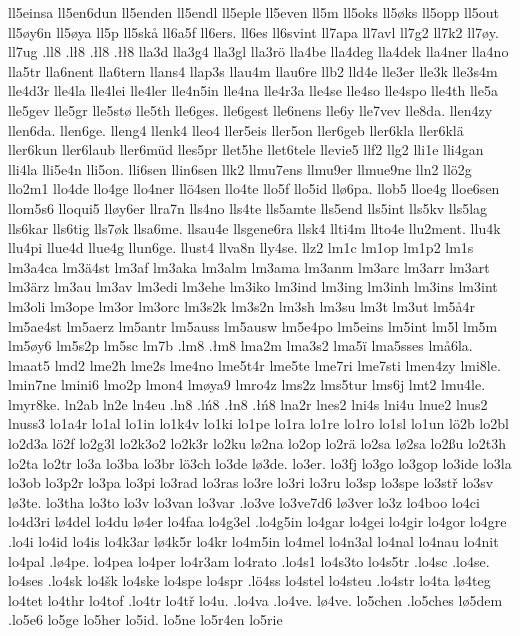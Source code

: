 {{ll5einsa
ll5en6dun
ll5enden
ll5endl
ll5eple
ll5even
ll5m
ll5oks
ll5øks
ll5opp
ll5out
ll5øy6n
ll5øya
ll5p
ll5skå
ll6a5f
ll6ers.
ll6es
ll6svint
ll7apa
ll7avl
ll7g2
ll7k2
ll7øy.
ll7ug
.ll8
.lł8
.łl8
.łł8
lla3d
lla3g4
lla3gl
lla3rö
lla4be
lla4deg
lla4dek
lla4ner
lla4no
lla5tr
lla6nent
lla6tern
llans4
llap3s
llau4m
llau6re
llb2
lld4e
lle3er
lle3k
lle3s4m
lle4d3r
lle4la
lle4lei
lle4ler
lle4n5in
lle4na
lle4r3a
lle4se
lle4so
lle4spo
lle4th
lle5a
lle5gev
lle5gr
lle5stø
lle5th
lle6ges.
lle6gest
lle6nens
lle6y
lle7vev
lle8da.
llen4zy
llen6da.
llen6ge.
lleng4
llenk4
lleo4
ller5eis
ller5on
ller6geb
ller6kla
ller6klä
ller6kun
ller6laub
ller6müd
lles5pr
llet5he
llet6tele
llevie5
llf2
llg2
lli1e
lli4gan
lli4la
lli5e4n
lli5on.
lli6sen
llin6sen
llk2
llmu7ens
llmu9er
llmue9ne
lln2
llö2g
llo2m1
llo4de
llo4ge
llo4ner
llö4sen
llo4te
llo5f
llo5id
llø6pa.
llob5
lloe4g
lloe6sen
llom5s6
lloqui5
lløy6er
llra7n
lls4no
lls4te
lls5amte
lls5end
lls5int
lls5kv
lls5lag
lls6kar
lls6tig
lls7øk
llsa6me.
llsau4e
llsgene6ra
llsk4
llti4m
llto4e
llu2ment.
llu4k
llu4pi
llue4d
llue4g
llun6ge.
llust4
llva8n
lly4se.
llz2
lm1c
lm1op
lm1p2
lm1s
lm3a4ca
lm3ä4st
lm3af
lm3aka
lm3alm
lm3ama
lm3anm
lm3arc
lm3arr
lm3art
lm3ärz
lm3au
lm3av
lm3edi
lm3ehe
lm3iko
lm3ind
lm3ing
lm3inh
lm3ins
lm3int
lm3oli
lm3ope
lm3or
lm3orc
lm3s2k
lm3s2n
lm3sh
lm3su
lm3t
lm3ut
lm5å4r
lm5ae4st
lm5aerz
lm5antr
lm5auss
lm5ausw
lm5e4po
lm5eins
lm5int
lm5l
lm5m
lm5øy6
lm5s2p
lm5sc
lm7b
.lm8
.łm8
lma2m
lma3s2
lma5ï
lma5sses
lmå6la.
lmaat5
lmd2
lme2h
lme2s
lme4no
lme5t4r
lme5te
lme7ri
lme7sti
lmen4zy
lmi8le.
lmin7ne
lmini6
lmo2p
lmon4
lmøya9
lmro4z
lms2z
lms5tur
lms6j
lmt2
lmu4le.
lmyr8ke.
ln2ab
ln2e
ln4eu
.ln8
.lń8
.łn8
.łń8
lna2r
lnes2
lni4s
lni4u
lnue2
lnus2
lnuss3
lo1a4r
lo1al
lo1in
lo1k4v
lo1ki
lo1pe
lo1ra
lo1re
lo1ro
lo1sl
lo1un
lö2b
lo2bl
lo2d3a
lö2f
lo2g3l
lo2k3o2
lo2k3r
lo2ku
lø2na
lo2op
lo2rä
lo2sa
lø2sa
lo2ßu
lo2t3h
lo2ta
lo2tr
lo3a
lo3ba
lo3br
lö3ch
lo3de
lø3de.
lo3er.
lo3fj
lo3go
lo3gop
lo3ide
lo3la
lo3ob
lo3p2r
lo3pa
lo3pi
lo3rad
lo3ras
lo3re
lo3ri
lo3ru
lo3sp
lo3spe
lo3stř
lo3sv
lø3te.
lo3tha
lo3to
lo3v
lo3van
lo3var
.lo3ve
lo3ve7d6
lø3ver
lo3z
lo4boo
lo4ci
lo4d3ri
lø4del
lo4du
lø4er
lo4faa
lo4g3el
.lo4g5in
lo4gar
lo4gei
lo4gir
lo4gor
lo4gre
.lo4i
lo4id
lo4is
lo4k3ar
lø4k5r
lo4kr
lo4m5in
lo4mel
lo4n3al
lo4nal
lo4nau
lo4nit
lo4pal
.lø4pe.
lo4pea
lo4per
lo4r3am
lo4rato
.lo4s1
lo4s3to
lo4s5tr
.lo4sc
.lo4se.
lo4ses
.lo4sk
lo4šk
lo4ske
lo4spe
lo4spr
.lö4ss
lo4stel
lo4steu
.lo4str
lo4ta
lø4teg
lo4tet
lo4thr
lo4tof
.lo4tr
lo4tř
lo4u.
.lo4va
.lo4ve.
lø4ve.
lo5chen
.lo5ches
lø5dem
.lo5e6
lo5ge
lo5her
lo5id.
lo5ne
lo5r4en
lo5rie
}}
